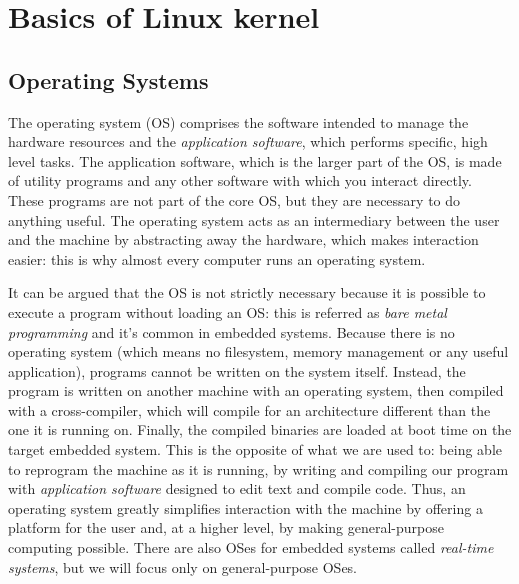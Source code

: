 \documentclass[10pt]{book}
\begin{document}
\chapter{Basics of Linux kernel}
\label{ch:introduction}

\section{Operating Systems}
\label{sec:os}
The operating system (OS) comprises the software intended to manage the hardware resources and the \textit{application software}, which performs specific, high level tasks. The application software, which is the larger part of the OS, is made of utility programs and any other software with which you interact directly. These programs are not part of the core OS, but they are necessary to do anything useful. The operating system acts as an intermediary between the user and the machine by abstracting away the hardware, which makes interaction easier: this is why almost every computer runs an operating system.

It can be argued that the OS is not strictly necessary because it is possible to execute a program without loading an OS: this is referred as \textit{bare metal programming} and it's common in embedded systems. Because there is no operating system (which means no filesystem, memory management or any useful application), programs cannot be written on the system itself. Instead, the program is written on another machine with an operating system, then compiled with a cross-compiler, which will compile for an architecture different than the one it is running on. Finally, the compiled binaries are loaded at boot time on the target embedded system. This is the opposite of what we are used to: being able to reprogram the machine as it is running, by writing and compiling our program with \textit{application software} designed to edit text and compile code. Thus, an operating system greatly simplifies interaction with the machine by offering a platform for the user and, at a higher level, by making general-purpose computing possible. There are also OSes for embedded systems called \textit{real-time systems}, but we will focus only on general-purpose OSes. 
\end{document}
